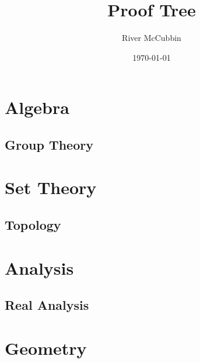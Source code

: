 \documentclass{book}
\title{Proof Tree}
\author{River McCubbin}
\date{\today}
\begin{document}
\maketitle

\ifdefined\HCode\else\tableofcontents\fi

\chapter{Algebra}
        \section{Group Theory}
                
                


\chapter{Set Theory}
        \section{Topology}


\chapter{Analysis}
        \section{Real Analysis}


\chapter{Geometry}
        
\end{document}
